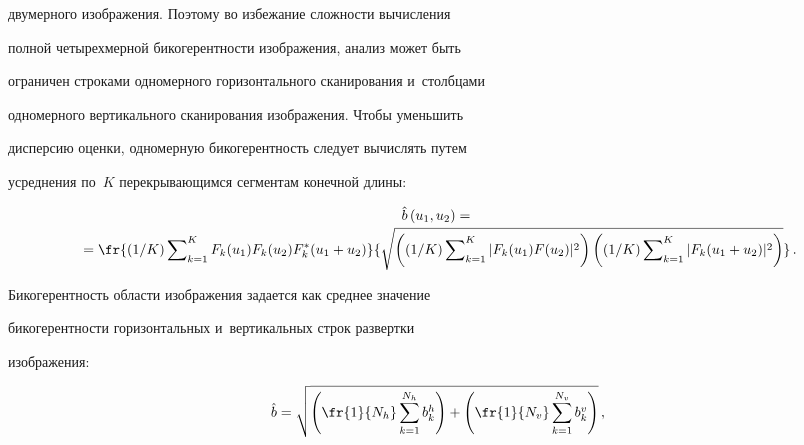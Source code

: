 двумерного изображения. Поэтому во избежание сложности вычисления 


полной четырехмерной би\-ко\-ге\-рент\-ности изображения, анализ может быть 


ограничен строками одномерного горизонтального сканирования и~столбцами 


одномерного вертикального сканирования изоб\-ра\-же\-ния. Чтобы уменьшить 


дисперсию оценки, одномерную би\-ко\-ге\-рент\-ность следует вы\-чис\-лять путем 


усред\-не\-ния по~$K$ пе\-ре\-кры\-ва\-ющим\-ся сегментам конечной длины:





\vspace*{-6pt}





\noindent


  \begin{multline}


  \hat{b}\left(u_1,u_2\right) ={}\\[-2pt]


  {}=\fr{(1/K) \sum\nolimits^K_{k=1} F_k(u_1) F_k(u_2) F_k^*(u_1+u_2)} 


{\sqrt{\left((1/K) \sum\nolimits^K_{k=1} \vert F_k(u_1) F(u_2)\vert^2\right) \left( 


(1/K) \sum\nolimits^K_{k=1} \vert F_k(u_1+u_2)\vert^2\right)}}\,.


  \label{e6-nikt}


  \end{multline}


  


  \vspace*{-4pt}


  


  Бикогерентность области изображения задается как среднее значение 


би\-ко\-ге\-рент\-ности горизонтальных и~вертикальных строк развертки 


изображения:


  \begin{equation*}


  \hat{b} = \sqrt{\left( \fr{1}{N_h}\sum\limits_{k=1}^{N_h} b_k^h\right) +\left( 


\fr{1}{N_v}\sum\limits_{k=1}^{N_v} b_k^v\right)}\,,




  \end{equation*}


